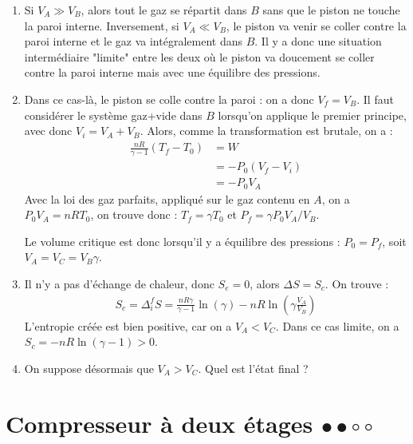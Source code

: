 \begin{correction}

\begin{enumerate}

\item Si $V_A\gg V_B$, alors tout le gaz se répartit dans $B$ sans que le piston ne touche la paroi interne. Inversement, si $V_A\ll V_B$, le piston va venir se coller contre la paroi interne et le gaz va intégralement dans $B$. Il y a donc une situation intermédiaire "limite" entre les deux où le piston va doucement se coller contre la paroi interne mais avec une équilibre des pressions.

\item Dans ce cas-là, le piston se colle contre la paroi : on a donc $V_f=V_B$. Il faut considérer le système {gaz+vide dans $B$} lorsqu'on applique le premier principe, avec donc $V_i=V_A+V_B$. Alors, comme la transformation est brutale, on a :
\begin{align*}
	\frac{nR}{\gamma-1}(T_f-T_0)&=W \\
	&=-P_0(V_f-V_i) \\
	&=-P_0V_A
\end{align*}
Avec la loi des gaz parfaits, appliqué sur le gaz contenu en $A$, on a $P_0V_A=nRT_0$, on trouve donc :  $T_f=\gamma T_0$ et $P_f=\gamma P_0V_A/V_B$.

Le volume critique est donc lorsqu'il y a équilibre des pressions : $P_0=P_f$, soit $V_A=V_C=V_B\gamma$.


\item Il n'y a pas d'échange de chaleur, donc $S_e=0$, alors $\Delta S=S_c$. On trouve :
\begin{align*}
	S_c=\Delta_i^f S=\frac{nR\gamma}{\gamma-1}\ln\left(\gamma \right) - nR\ln\left(\gamma\frac{V_A}{V_B} \right)
\end{align*}
L'entropie créée est bien positive, car on a $V_A<V_C$. Dans ce cas limite, on a $S_c=-nR\ln(\gamma-1)>0$.


\item On suppose désormais que $V_A>V_C$. Quel est l'état final ?

\end{enumerate}

\end{correction}

\newpage

\section{Compresseur à deux étages $\bullet\bullet\circ\circ$}

